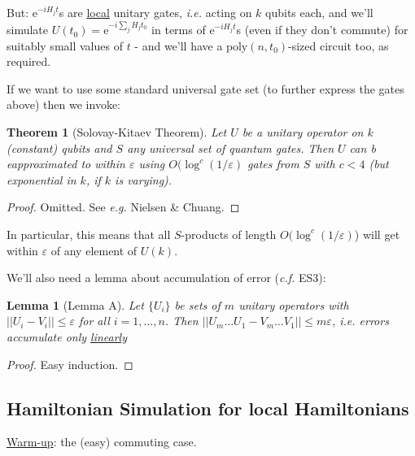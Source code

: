 \documentclass[]{article}
\theoremstyle{custhm}
\theoremstyle{cusdef}
\theoremstyle{custhm}
\newtheorem{lemma}[theorem]{Lemma}
\theoremstyle{custhm}
\theoremstyle{custhm}
\theoremstyle{custhm}
\newtheorem*{theorem*}{Theorem}
\theoremstyle{cusdef}
\theoremstyle{remark}
\newcommand{\e}{\mathrm{e}}
\newcommand{\eps}{\varepsilon}
\renewcommand{\it}[1]{\textit{#1}}
\newcommand{\poly}{\textrm{poly}}
\begin{document}
But: $\e^{-iH_jt}$s are \underline{local} unitary gates, \it{i.e.} acting on $k$ qubits each, and we'll simulate $U(t_0) = \e^{-i\sum_jH_jt_0}$ in terms of $\e^{-iH_jt}$s (even if they don't commute) for suitably small values of $t$ - and we'll have a $\poly(n,t_0)$-sized circuit too, as required.

If we want to use some standard universal gate set (to further express the gates above) then we invoke:

\begin{theorem*}[Solovay-Kitaev Theorem]
	Let $U$ be a unitary operator on $k$ (constant) qubits and $S$ any universal set of quantum gates. Then $U$ can b eapproximated to within $\eps$ using $O(\log^c(1/\eps)$ gates from $S$ with $c < 4$ (but exponential in $k$, if $k$ is varying).
\end{theorem*}
\begin{proof}
	Omitted. See \it{e.g.} Nielsen \& Chuang.
\end{proof}

In particular, this means that all $S$-products of length $O(\log^c(1/\eps)$) will get within $\eps$ of any element of $U(k)$.

We'll also need a lemma about accumulation of error (\it{c.f.} ES3):

\begin{lemma}[Lemma A]
	Let $\{U_i\}$ be sets of $m$ unitary operators with $||U_i-V_i||\le \eps$  for all $i = 1,\dots,n$. Then $||U_m\dots U_1-V_m\dots V_1|| \le m\eps$, \it{i.e.} errors accumulate only \underline{linearly}
\end{lemma}
\begin{proof}
	Easy induction.
\end{proof}

\subsection{Hamiltonian Simulation for local Hamiltonians}

\underline{Warm-up}: the (easy) commuting case.
\end{document}
